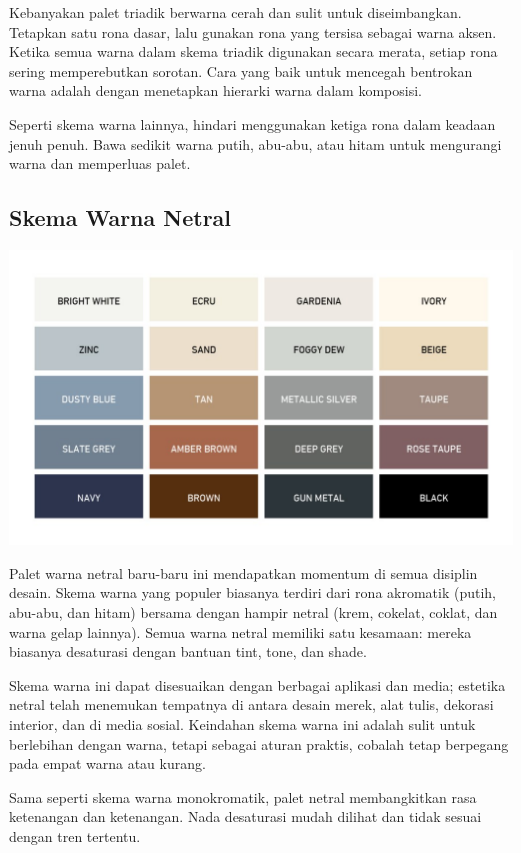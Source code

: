 \documentclass[a4paper]{article}
\begin{document}
Kebanyakan palet triadik berwarna cerah dan sulit untuk diseimbangkan. Tetapkan satu rona dasar, lalu gunakan rona yang tersisa sebagai warna aksen. Ketika semua warna dalam skema triadik digunakan secara merata, setiap rona sering memperebutkan sorotan. Cara yang baik untuk mencegah bentrokan warna adalah dengan menetapkan hierarki warna dalam komposisi.

Seperti skema warna lainnya, hindari menggunakan ketiga rona dalam keadaan jenuh penuh. Bawa sedikit warna putih, abu-abu, atau hitam untuk mengurangi warna dan memperluas palet.

\subsection{Skema Warna Netral}
\begin{center}
  \includegraphics[width=\textwidth]{resources/netral.jpg}
\end{center}
Palet warna netral baru-baru ini mendapatkan momentum di semua disiplin desain. Skema warna yang populer biasanya terdiri dari rona akromatik (putih, abu-abu, dan hitam) bersama dengan hampir netral (krem, cokelat, coklat, dan warna gelap lainnya). Semua warna netral memiliki satu kesamaan: mereka biasanya desaturasi dengan bantuan tint, tone, dan shade.

Skema warna ini dapat disesuaikan dengan berbagai aplikasi dan media; estetika netral telah menemukan tempatnya di antara desain merek, alat tulis, dekorasi interior, dan di media sosial. Keindahan skema warna ini adalah sulit untuk berlebihan dengan warna, tetapi sebagai aturan praktis, cobalah tetap berpegang pada empat warna atau kurang.

Sama seperti skema warna monokromatik, palet netral membangkitkan rasa ketenangan dan ketenangan. Nada desaturasi mudah dilihat dan tidak sesuai dengan tren tertentu.
\end{document}
